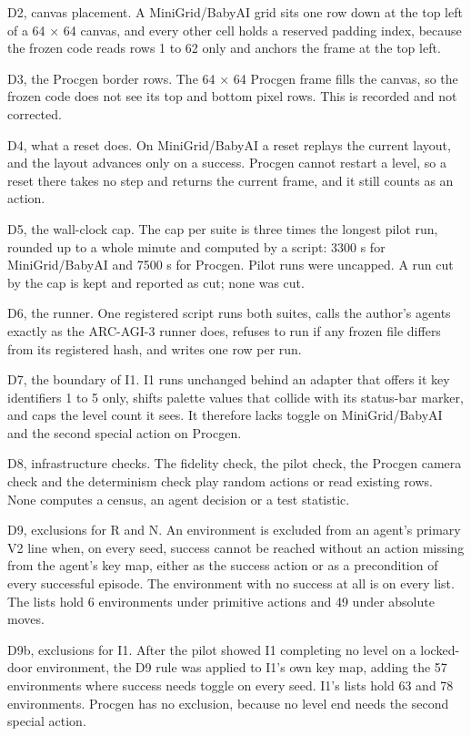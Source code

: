 \documentclass[journal,onecolumn]{IEEEtran}
\begin{document}
D2, canvas placement. A MiniGrid/BabyAI grid sits one row down at the
top left of a 64 × 64 canvas, and every other cell holds a reserved
padding index, because the frozen code reads rows 1 to 62 only and
anchors the frame at the top left.

D3, the Procgen border rows. The 64 × 64 Procgen frame fills the canvas,
so the frozen code does not see its top and bottom pixel rows. This is
recorded and not corrected.

D4, what a reset does. On MiniGrid/BabyAI a reset replays the current
layout, and the layout advances only on a success. Procgen cannot
restart a level, so a reset there takes no step and returns the current
frame, and it still counts as an action.

D5, the wall-clock cap. The cap per suite is three times the longest
pilot run, rounded up to a whole minute and computed by a script: 3300 s
for MiniGrid/BabyAI and 7500 s for Procgen. Pilot runs were uncapped. A
run cut by the cap is kept and reported as cut; none was cut.

D6, the runner. One registered script runs both suites, calls the
author's agents exactly as the ARC-AGI-3 runner does, refuses to run if
any frozen file differs from its registered hash, and writes one row per
run.

D7, the boundary of I1. I1 runs unchanged behind an adapter that offers
it key identifiers 1 to 5 only, shifts palette values that collide with
its status-bar marker, and caps the level count it sees. It therefore
lacks toggle on MiniGrid/BabyAI and the second special action on
Procgen.

D8, infrastructure checks. The fidelity check, the pilot check, the
Procgen camera check and the determinism check play random actions or
read existing rows. None computes a census, an agent decision or a test
statistic.

D9, exclusions for R and N. An environment is excluded from an agent's
primary V2 line when, on every seed, success cannot be reached without
an action missing from the agent's key map, either as the success action
or as a precondition of every successful episode. The environment with
no success at all is on every list. The lists hold 6 environments under
primitive actions and 49 under absolute moves.

D9b, exclusions for I1. After the pilot showed I1 completing no level on
a locked-door environment, the D9 rule was applied to I1's own key map,
adding the 57 environments where success needs toggle on every seed.
I1's lists hold 63 and 78 environments. Procgen has no exclusion,
because no level end needs the second special action.
\end{document}
